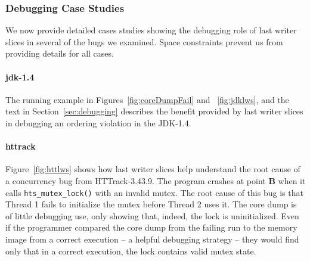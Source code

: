 \documentclass[preprint,9pt]{sigplanconf}
\begin{document}
\subsubsection{Debugging Case Studies}
\label{sec:eval:debugging:cases}

We now provide detailed cases studies showing the debugging role of last writer
slices in several of the bugs we examined.  Space constraints prevent us from
providing details for all cases.

\paragraph{jdk-1.4}
The running example in Figures~\ref{fig:coreDumpFail} and ~\ref{fig:jdklws},
and the text in Section~\ref{sec:debugging} describes the benefit provided by
last writer slices in debugging an ordering violation in the JDK-1.4.

%


\paragraph{httrack}
Figure~\ref{fig:httlws} shows how last writer slices help understand the root
cause of a concurrency bug from HTTrack-3.43.9.  The program crashes at point
{\bf B} when it calls {\tt hts\_mutex\_lock()} with an invalid mutex.    The
root cause of this bug is that Thread 1 fails to initialize the mutex before
Thread 2 uses it.   The core dump is of little debugging use, only showing
that, indeed, the lock is uninitialized.  Even if the programmer compared the
core dump from the failing run to the memory image from a correct execution --
a helpful debugging strategy -- they would find only that in a correct
execution, the lock contains valid mutex state.
\end{document}
